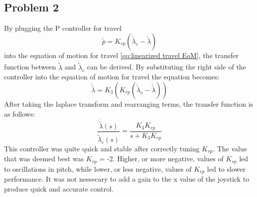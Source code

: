 \subsection{Problem 2}
By plugging the P controller for travel 
\begin{equation}
\label{travel P controller}
	\tilde{p} = K_{rp}(\dot{\tilde{\lambda}}_c - \dot{\tilde{\lambda}})
\end{equation}
into the equation of motion for travel \cref{eq:linearized travel EoM}, the transfer function between $\dot{\tilde{\lambda}}$ and $\dot{\tilde{\lambda}}_c$  can be derived. By substituting the right side of the controller into the equation of motion for travel the equation becomes:
\begin{equation}
\label{eq:p controller in travel EoM}
	\ddot{\tilde{\lambda}} = K_3(K_{rp}(\dot{\tilde{\lambda}}_c - \dot{\tilde{\lambda}}))
\end{equation}
After taking the laplace transform and rearranging terms, the transfer function is as follows:
\begin{equation}
\label{eq:Transfer function between travel and desired travel}
	\frac{\dot{\tilde{\lambda}}(s)}{\dot{\tilde{\lambda}}_c(s)} = \frac{K_3K_{rp}}{s + K_3K_{rp}}
\end{equation}
This controller was quite quick and stable after correctly tuning $K_{rp}$. The value that was deemed best was $K_{rp}$ = -2. Higher, or more negative, values of $K_{rp}$ led to oscillations in pitch, while lower, or less negative, values of $K_{rp}$ led to slower performance.  It was not nessecary to add a gain to the x value of the joystick to produce quick and accurate control.


